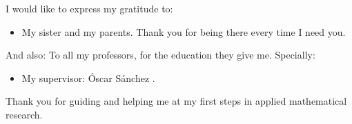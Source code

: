 
\cleardoublepage


\begin{acknowledgements}

I would like to express my gratitude to:
\begin{itemize}
	\item My sister and my parents. Thank you for being there every time I need you.
\end{itemize}


And also: To all my professors, for the education they give me. Specially: 
\begin{itemize}
 \item My supervisor: Óscar Sánchez .
 \vspace*{3mm}
\end{itemize}
Thank you for guiding and helping me at my first steps in applied mathematical research.
\end{acknowledgements}
